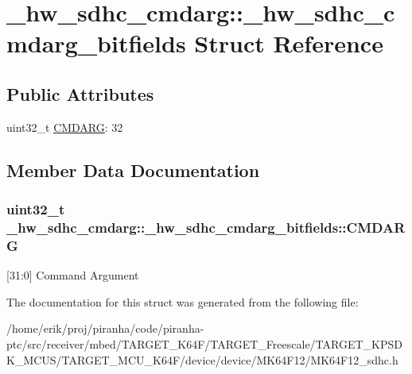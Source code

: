 \hypertarget{struct__hw__sdhc__cmdarg_1_1__hw__sdhc__cmdarg__bitfields}{}\section{\+\_\+hw\+\_\+sdhc\+\_\+cmdarg\+:\+:\+\_\+hw\+\_\+sdhc\+\_\+cmdarg\+\_\+bitfields Struct Reference}
\label{struct__hw__sdhc__cmdarg_1_1__hw__sdhc__cmdarg__bitfields}
\subsection*{Public Attributes}
\begin{DoxyCompactItemize}
\item 
uint32\+\_\+t \hyperlink{struct__hw__sdhc__cmdarg_1_1__hw__sdhc__cmdarg__bitfields_ab429ae95266b2f84ac261f12b71ebd54}{C\+M\+D\+A\+RG}\+: 32
\end{DoxyCompactItemize}


\subsection{Member Data Documentation}
\subsubsection[{\texorpdfstring{C\+M\+D\+A\+RG}{CMDARG}}]{\setlength{\rightskip}{0pt plus 5cm}uint32\+\_\+t \+\_\+hw\+\_\+sdhc\+\_\+cmdarg\+::\+\_\+hw\+\_\+sdhc\+\_\+cmdarg\+\_\+bitfields\+::\+C\+M\+D\+A\+RG}\hypertarget{struct__hw__sdhc__cmdarg_1_1__hw__sdhc__cmdarg__bitfields_ab429ae95266b2f84ac261f12b71ebd54}{}\label{struct__hw__sdhc__cmdarg_1_1__hw__sdhc__cmdarg__bitfields_ab429ae95266b2f84ac261f12b71ebd54}
\mbox{[}31\+:0\mbox{]} Command Argument 

The documentation for this struct was generated from the following file\+:\begin{DoxyCompactItemize}
\item 
/home/erik/proj/piranha/code/piranha-\/ptc/src/receiver/mbed/\+T\+A\+R\+G\+E\+T\+\_\+\+K64\+F/\+T\+A\+R\+G\+E\+T\+\_\+\+Freescale/\+T\+A\+R\+G\+E\+T\+\_\+\+K\+P\+S\+D\+K\+\_\+\+M\+C\+U\+S/\+T\+A\+R\+G\+E\+T\+\_\+\+M\+C\+U\+\_\+\+K64\+F/device/device/\+M\+K64\+F12/M\+K64\+F12\+\_\+sdhc.\+h\end{DoxyCompactItemize}
